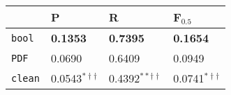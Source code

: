\begin{tabular}{llll}
\toprule
{} &                            P &                            R &                     F$_{0.5}$ \\
\midrule
\texttt{bool}    &  \textbf{0.1353} &  \textbf{0.7395} &            \textbf{0.1654} \\
\texttt{PDF}     &                  0.0690$^{}$ &                  0.6409$^{}$ &                 0.0949$^{}$ \\
\texttt{clean} &   0.0543$^{*\dagger\dagger}$ &  0.4392$^{**\dagger\dagger}$ &  0.0741$^{*\dagger\dagger}$ \\
\bottomrule
\end{tabular}
